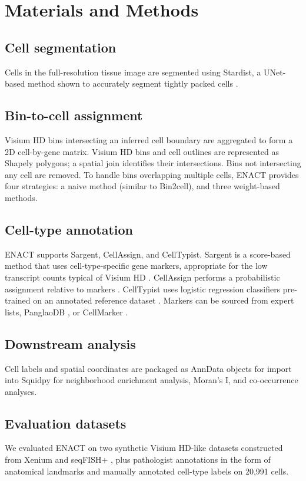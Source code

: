 \documentclass[11pt]{article}
\begin{document}
\section{Materials and Methods}
\subsection{Cell segmentation}
Cells in the full-resolution tissue image are segmented using Stardist, a UNet-based method shown to accurately segment tightly packed cells \citep{r4}.

\subsection{Bin-to-cell assignment}
Visium HD bins intersecting an inferred cell boundary are aggregated to form a 2D cell-by-gene matrix. Visium HD bins and cell outlines are represented as Shapely \citep{r10} polygons; a spatial join identifies their intersections. Bins not intersecting any cell are removed. To handle bins overlapping multiple cells, ENACT provides four strategies: a naive method (similar to Bin2cell), and three weight-based methods.

\subsection{Cell-type annotation}
ENACT supports Sargent, CellAssign, and CellTypist. Sargent is a score-based method that uses cell-type-specific gene markers, appropriate for the low transcript counts typical of Visium HD \citep{r7}. CellAssign performs a probabilistic assignment relative to markers \citep{r5}. CellTypist uses logistic regression classifiers pre-trained on an annotated reference dataset \citep{r6}. Markers can be sourced from expert lists, PanglaoDB \citep{r11}, or CellMarker \citep{r12}.

\subsection{Downstream analysis}
Cell labels and spatial coordinates are packaged as AnnData objects for import into Squidpy for neighborhood enrichment analysis, Moran's I, and co-occurrence analyses.

\subsection{Evaluation datasets}
We evaluated ENACT on two synthetic Visium HD-like datasets constructed from Xenium \citep{r13} and seqFISH+ \citep{r14}, plus pathologist annotations in the form of anatomical landmarks and manually annotated cell-type labels on 20,991 cells.
\end{document}
